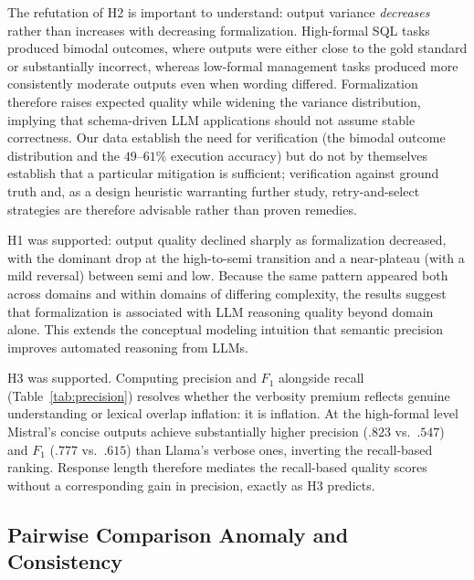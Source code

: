 \documentclass[runningheads]{llncs}
\begin{document}
The refutation of H2 is important to understand: output variance \textit{decreases} rather than increases with decreasing formalization. High-formal SQL tasks produced bimodal outcomes, where outputs were either close to the gold standard or substantially incorrect, whereas low-formal management tasks produced more consistently moderate outputs even when wording differed. Formalization therefore raises expected quality while widening the variance distribution, implying that schema-driven LLM applications should not assume stable correctness. Our data establish the need for verification (the bimodal outcome distribution and the $49$--$61\%$ execution accuracy) but do not by themselves establish that a particular mitigation is sufficient; verification against ground truth and, as a design heuristic warranting further study, retry-and-select strategies are therefore advisable rather than proven remedies.

H1 was supported: output quality declined sharply as formalization decreased, with the dominant drop at the high-to-semi transition and a near-plateau (with a mild reversal) between semi and low. Because the same pattern appeared both across domains and within domains of differing complexity, the results suggest that formalization is associated with LLM reasoning quality beyond domain alone. This extends the conceptual modeling intuition that semantic precision improves automated reasoning from LLMs.

H3 was supported. Computing precision and $F_1$ alongside recall (Table~\ref{tab:precision}) resolves whether the verbosity premium reflects genuine understanding or lexical overlap inflation: it is inflation. At the high-formal level Mistral's concise outputs achieve substantially higher precision ($.823$ vs.\ $.547$) and $F_1$ ($.777$ vs.\ $.615$) than Llama's verbose ones, inverting the recall-based ranking. Response length therefore mediates the recall-based quality scores without a corresponding gain in precision, exactly as H3 predicts.

\subsection{Pairwise Comparison Anomaly and Consistency}
\label{sec:pairwise-anomaly}
\end{document}
